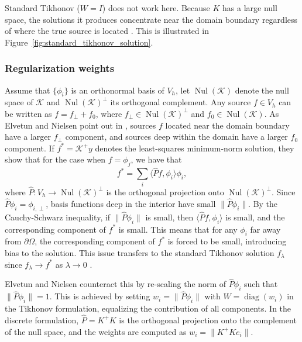Standard Tikhonov ($W = I$) does not work here. Because $K$ has a large null space, the solutions it produces concentrate near the domain boundary regardless of where the true source is located \cite{elvetunRegularizationOperatorSource2020}. This is illustrated in Figure~\ref{fig:standard_tikhonov_solution}.


\subsubsection{Regularization weights}
Assume that $\{ \phi_i \}$ is an orthonormal basis of $V_h$, let $\operatorname{Nul}(\mathcal{K})$ denote the null space of $\mathcal{K}$ and $\operatorname{Nul}(\mathcal{K})^\perp$ its orthogonal complement. Any source $f \in V_h$ can be written as $f = f_\perp + f_0$, where $f_\perp \in \operatorname{Nul}(\mathcal{K})^\perp$ and $f_0 \in \operatorname{Nul}(\mathcal{K})$. As Elvetun and Nielsen point out in \cite{elvetunRegularizationOperatorSource2020}, sources $f$ located near the domain boundary have a larger $f_\perp$ component, and sources deep within the domain have a larger $f_0$ component. If $f^* = \mathcal{K}^+ y$ denotes the least-squares minimum-norm solution, they show that for the case when $f = \phi_j$, we have that
\begin{equation*}
    f^* = \sum_{i} \langle \hat P f, \phi_i \rangle \phi_i,    
\end{equation*}
where $\hat P: V_h \to \operatorname{Nul}(\mathcal{K})^\perp$ is the orthogonal projection onto $\operatorname{Nul}(\mathcal{K})^\perp$. Since $\hat{P}\phi_i = \phi_{i,\perp}$, basis functions deep in the interior have small $\|\hat{P}\phi_i \|$. By the Cauchy-Schwarz inequality, if $\| \hat P \phi_i \|$ is small, then $\langle \hat Pf, \phi_i \rangle$ is small, and the corresponding component of $f^*$ is small. This means that for any $\phi_i$ far away from $\partial \Omega$, the corresponding component of $f^*$ is forced to be small, introducing bias to the solution. This issue transfers to the standard Tikhonov solution $f_\lambda$ since $f_\lambda \to f^*$ as $\lambda \to 0$ \cite{engl1996regularization}.

Elvetun and Nielsen counteract this by re-scaling the norm of $\hat P \phi_i$ such that $\| \hat P \phi_i \| = 1$. This is achieved by setting $w_i = \| \hat P \phi_i \|$ with $W = \operatorname{diag}(w_i)$ in the Tikhonov formulation, equalizing the contribution of all components. In the discrete formulation, $\hat P = K^+ K$ is the orthogonal projection onto the complement of the null space, and the weights are computed as $w_i = \|K^+ K e_i\|$.

